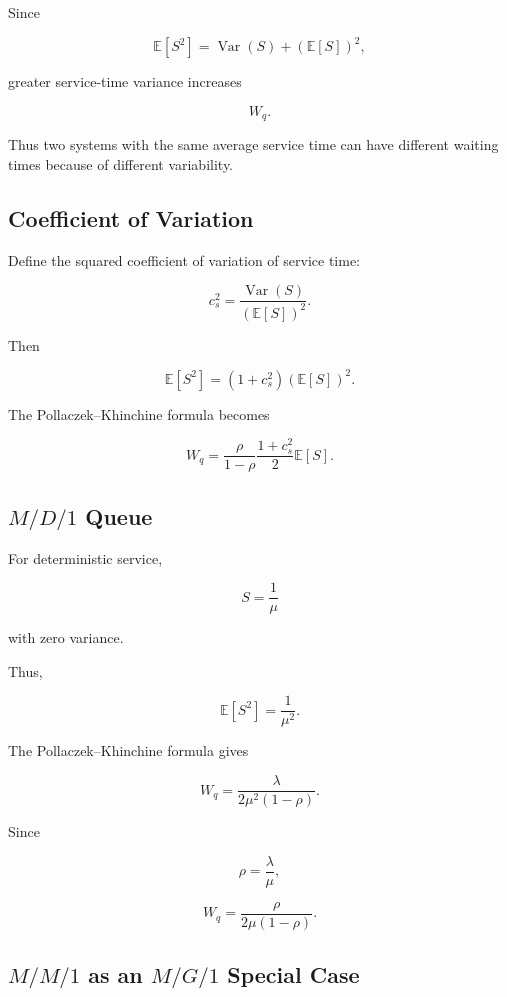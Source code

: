 Since

\[
\mathbb{E}[S^2]
=
\operatorname{Var}(S)
+
(
\mathbb{E}[S]
)^2,
\]

greater service-time variance increases

\[
W_q.
\]

Thus two systems with the same average service time can have different
waiting times because of different variability.

\subsection{Coefficient of Variation}
\label{subsec:service-coefficient-variation}

Define the squared coefficient of variation of service time:

\[
\boxed{
c_s^2
=
\frac{
\operatorname{Var}(S)
}{
(
\mathbb{E}[S]
)^2
}.
}
\]

Then

\[
\boxed{
\mathbb{E}[S^2]
=
(1+c_s^2)
(
\mathbb{E}[S]
)^2.
}
\]

The Pollaczek--Khinchine formula becomes

\[
\boxed{
W_q
=
\frac{
\rho
}{
1-\rho
}
\frac{
1+c_s^2
}{
2
}
\mathbb{E}[S].
}
\]

\subsection{\(M/D/1\) Queue}
\label{subsec:md1-queue}

For deterministic service,

\[
\boxed{
S=\frac1\mu
}
\]

with zero variance.

Thus,

\[
\mathbb{E}[S^2]
=
\frac1{\mu^2}.
\]

The Pollaczek--Khinchine formula gives

\[
\boxed{
W_q
=
\frac{
\lambda
}{
2\mu^2(1-\rho)
}.
}
\]

Since

\[
\rho
=
\frac{\lambda}{\mu},
\]

\[
\boxed{
W_q
=
\frac{
\rho
}{
2\mu(1-\rho)
}.
}
\]

\subsection{\(M/M/1\) as an \(M/G/1\) Special Case}
\label{subsec:mm1-as-mg1}

